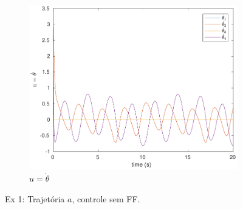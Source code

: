 \documentclass[a4paper,11pt]{article}
\theoremstyle{mytheor}
\begin{document}
\begin{figure}[!ht]
\begin{minipage}{\linewidth}
\begin{subfigure}[b]{0.4\textwidth}
    \end{subfigure}
    \begin{subfigure}[b]{0.4\textwidth}
    \includegraphics[width=1\textwidth]{figs/ex1_a_2_dq.pdf}
    \caption{$u = \dot{\theta}$}
    \label{fig:ex1_a_2_dq}
    \end{subfigure}
  \end{minipage}
\caption{Ex 1: Trajetória $a$, controle sem FF.}
\label{fig:ex1_a_2}
\end{figure}
\end{document}
